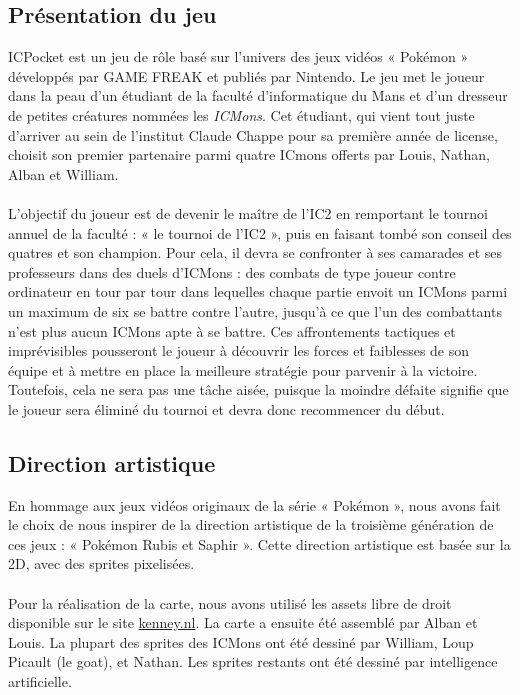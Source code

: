 \documentclass[12pt,a4paper, twoside]{article}
\begin{document}
    \subsection{Présentation du jeu}
        ICPocket est un jeu de rôle basé sur l'univers des jeux vidéos « Pokémon » développés par GAME FREAK et publiés par Nintendo.
        Le jeu met le joueur dans la peau d'un étudiant de la faculté d'informatique du Mans et d'un dresseur de petites créatures nommées les \emph{ICMons}.
        Cet étudiant, qui vient tout juste d'arriver au sein de l'institut Claude Chappe pour sa première année de license, choisit son premier partenaire parmi quatre ICmons offerts par Louis, Nathan, Alban et William.
        \paragraph{}L'objectif du joueur est de devenir le maître de l'IC2 en remportant le tournoi annuel de la faculté : « le tournoi de l'IC2 », puis en faisant tombé son conseil des quatres et son champion. Pour cela, il devra se confronter à ses camarades et ses professeurs dans des duels d'ICMons : 
        des combats de type joueur contre ordinateur en tour par tour dans lequelles chaque partie envoit un ICMons parmi un maximum de six se battre contre l'autre, jusqu'à ce que l'un des combattants n'est plus aucun ICMons apte à se battre.
        Ces affrontements tactiques et imprévisibles pousseront le joueur à découvrir les forces et faiblesses de son équipe et à mettre en place la meilleure stratégie pour parvenir à la victoire.
        Toutefois, cela ne sera pas une tâche aisée, puisque la moindre défaite signifie que le joueur sera éliminé du tournoi et devra donc recommencer du début.

    \subsection{Direction artistique}
        En hommage aux jeux vidéos originaux de la série « Pokémon », nous avons fait le choix de nous inspirer de la direction artistique de la troisième génération de ces jeux : « Pokémon Rubis et Saphir ».
        Cette direction artistique est basée sur la 2D, avec des sprites pixelisées. \paragraph{} Pour la réalisation de la carte, nous avons utilisé les assets libre de droit disponible sur le site \href{https://kenney.nl/assets}{kenney.nl}. La carte a ensuite été assemblé par Alban et Louis. La plupart des sprites des ICMons ont été dessiné par William, Loup Picault (le goat), et Nathan. Les sprites restants ont été dessiné par intelligence artificielle.
\end{document}
